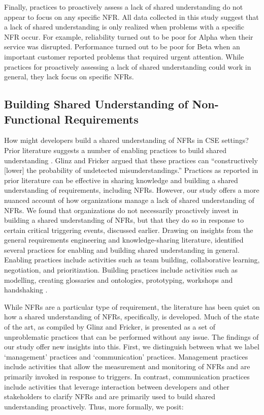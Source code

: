 \documentclass[smallextended]{svjour3}       %
\begin{document}
Finally, practices to proactively assess a lack of shared understanding do not appear to focus on any specific NFR. All data collected in this study suggest that a lack of shared understanding is only realized when problems with a specific NFR occur. For example, reliability turned out to be poor for Alpha when their service was disrupted. Performance turned out to be poor for Beta when an important customer reported problems that required urgent attention.
While practices for proactively assessing a lack of shared understanding could work in general, they lack focus on specific NFRs.








\subsection{Building Shared Understanding of Non-Functional Requirements}


How might developers \textmd{build} a shared understanding of NFRs in CSE settings? 
Prior literature suggests a number of enabling practices to build shared understanding \citep{glinz_shared_2015}. Glinz and Fricker argued that these practices can \textmd{``constructively [lower] the probability of undetected misunderstandings.''} Practices as reported in prior literature can be effective in sharing knowledge and building a shared understanding of requirements, including NFRs. However, our study offers a more nuanced account of how organizations manage a lack of shared understanding of NFRs. We found that organizations do not necessarily proactively invest in building a shared understanding of NFRs, but that they do so in response to certain critical triggering events, discussed earlier. 
Drawing on insights from the general requirements engineering and knowledge-sharing literature, \citet{glinz_shared_2015} identified several practices for enabling and building shared understanding in general. Enabling practices include activities such as team building, collaborative learning, negotiation, and prioritization. Building practices include activities such as modelling, creating glossaries and ontologies, prototyping, workshops and handshaking \citep{glinz_shared_2015}. 

While NFRs are a particular type of requirement, the literature has been quiet on how a shared understanding of NFRs, specifically, is developed. Much of the state of the art, as compiled by Glinz and Fricker, is presented as a set of unproblematic practices that can be performed without any issue. The findings of our study offer new insights into this. 
First, we distinguish between what we label \textmd{`management'} practices and \textmd{`communication'} practices. Management practices include activities that allow the measurement and monitoring of NFRs and are primarily invoked in response to triggers. In contrast, communication practices include activities that leverage interaction between developers and other stakeholders to clarify NFRs and are primarily used to build shared understanding proactively. Thus, more formally, we posit:
\end{document}
